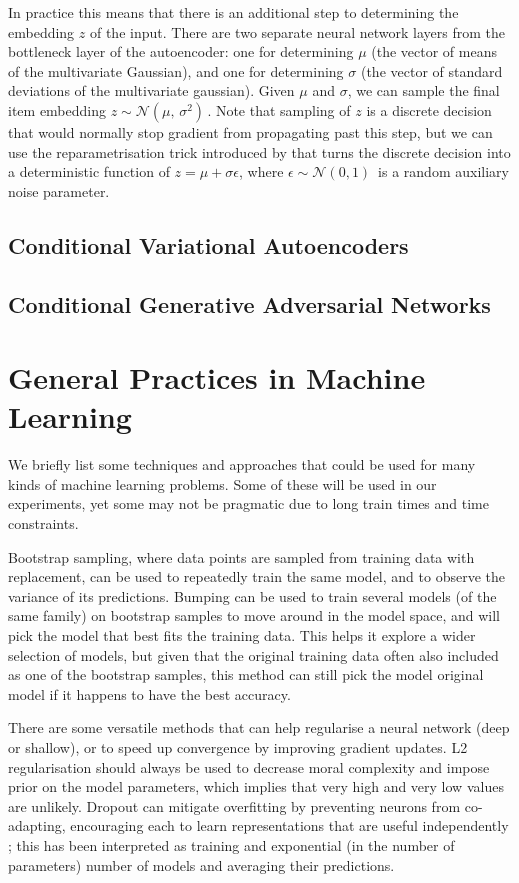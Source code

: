 In practice this means that  there is an additional step to determining the embedding $z$ of the input.
There are two separate neural network layers from the bottleneck layer of the autoencoder:  one for determining $\mu$ (the vector of means of the multivariate Gaussian), and one for determining $\sigma$ (the vector of standard deviations of the multivariate gaussian).
Given $\mu$ and $\sigma$, we can sample the final item embedding $z \sim \mathcal{N}(\mu,\,\sigma^{2})\,$.
Note that sampling of $z$ is a discrete decision that would normally stop gradient from propagating past this step, but we can use the reparametrisation trick introduced by \cite{vae} that turns the discrete decision into a deterministic function of $z = \mu + \sigma\epsilon$, where $\epsilon \sim \mathcal{N}(0, 1)\,$ is a random auxiliary noise parameter.

\subsection{Conditional Variational Autoencoders}



\subsection{Conditional Generative Adversarial Networks}


\section{General Practices in Machine Learning}

We briefly list some techniques and approaches that could be used for many kinds of machine learning problems.
Some of these will be used in our experiments, yet some may not be pragmatic due to long train times and time constraints.

Bootstrap sampling, where data points are sampled from training data with replacement, can be used to repeatedly train the same model, and to observe the variance of its predictions.
Bumping can be used to train several models (of the same family) on bootstrap samples to move around in the model space, and will pick the model that best fits the training data.
This helps it explore a wider selection of models, but given that the original training data often also included as one of the bootstrap samples, this method  can still pick the model original model if it happens to have the best accuracy.

There are some versatile methods that can help regularise a neural network (deep or shallow), or to speed up convergence by improving  gradient updates.
L2  regularisation should always be used to decrease moral complexity and impose prior on the model parameters, which  implies that very high and very low values are unlikely.
Dropout can mitigate overfitting by preventing neurons from co-adapting, encouraging each to learn representations that are useful independently \cite{dropout}; this has been interpreted as training and exponential (in the number of parameters) number of models and averaging their predictions.

